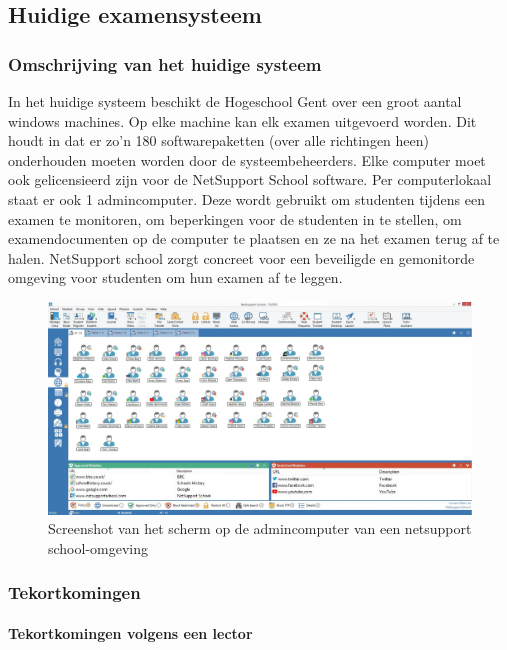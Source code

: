 \subsection{Huidige examensysteem}

\subsubsection{Omschrijving van het huidige systeem}
In het huidige systeem beschikt de Hogeschool Gent over een groot aantal windows machines. Op elke machine kan elk examen uitgevoerd worden. Dit houdt in dat er zo'n 180 softwarepaketten (over alle richtingen heen) onderhouden moeten worden door de systeembeheerders. Elke computer moet ook gelicensieerd zijn voor de NetSupport School software. Per computerlokaal staat er ook 1 admincomputer. Deze wordt gebruikt om studenten tijdens een examen te monitoren, om beperkingen voor de studenten in te stellen, om examendocumenten op de computer te plaatsen en ze na het examen terug af te halen. NetSupport school zorgt concreet voor een beveiligde en gemonitorde omgeving voor studenten om hun examen af te leggen. 



\begin{figure}
\includegraphics[width=\linewidth]{img/NetsupportAdmin.png}
\caption{Screenshot van het scherm op de admincomputer van een netsupport school-omgeving}
\label{fig:NetSupport1}
\end{figure}


\subsubsection{Tekortkomingen}


\paragraph{Tekortkomingen volgens een lector}


